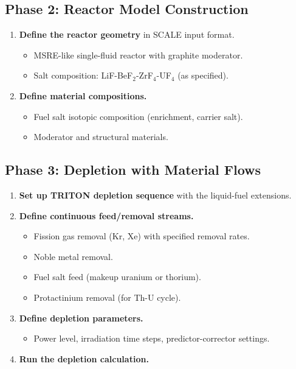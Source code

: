 \documentclass[11pt,a4paper]{article}
\begin{document}
\subsection{Phase 2: Reactor Model Construction}
\begin{enumerate}[label=\textbf{2.\arabic*}]
  \item \textbf{Define the reactor geometry} in SCALE input format.
    \begin{itemize}
      \item MSRE-like single-fluid reactor with graphite moderator.
      \item Salt composition: LiF-BeF$_2$-ZrF$_4$-UF$_4$ (as specified).
    \end{itemize}
  \item \textbf{Define material compositions.}
    \begin{itemize}
      \item Fuel salt isotopic composition (enrichment, carrier salt).
      \item Moderator and structural materials.
    \end{itemize}
\end{enumerate}

\subsection{Phase 3: Depletion with Material Flows}
\begin{enumerate}[label=\textbf{3.\arabic*}]
  \item \textbf{Set up TRITON depletion sequence} with the liquid-fuel extensions.
  \item \textbf{Define continuous feed/removal streams.}
    \begin{itemize}
      \item Fission gas removal (Kr, Xe) with specified removal rates.
      \item Noble metal removal.
      \item Fuel salt feed (makeup uranium or thorium).
      \item Protactinium removal (for Th-U cycle).
    \end{itemize}
  \item \textbf{Define depletion parameters.}
    \begin{itemize}
      \item Power level, irradiation time steps, predictor-corrector settings.
    \end{itemize}
  \item \textbf{Run the depletion calculation.}
\end{enumerate}
\end{document}

